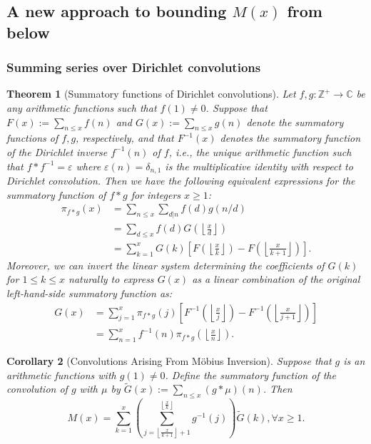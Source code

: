 \documentclass[11pt,reqno,a4letter]{article}
\numberwithin{figure}{section}
\numberwithin{table}{section}
\newcommand{\floor}[1]{\left\lfloor #1 \right\rfloor}
\newcommand{\Floor}[2]{\ensuremath{\left\lfloor \frac{#1}{#2} \right\rfloor}}
\theoremstyle{plain}
\newtheorem{theorem}{Theorem}
\newtheorem{cor}[theorem]{Corollary}
\numberwithin{theorem}{section}
\theoremstyle{definition}
\begin{document}
\subsection{A new approach to bounding $M(x)$ from below} 

\subsubsection{Summing series over Dirichlet convolutions} 

\begin{theorem}[Summatory functions of Dirichlet convolutions] 
\label{theorem_SummatoryFuncsOfDirCvls} 
Let $f,g: \mathbb{Z}^{+} \rightarrow \mathbb{C}$ be any arithmetic functions such that $f(1) \neq 0$. 
Suppose that $F(x) := \sum_{n \leq x} f(n)$ and $G(x) := \sum_{n \leq x} g(n)$ denote the summatory 
functions of $f,g$, respectively, and that $F^{-1}(x)$ denotes the summatory function of the 
Dirichlet inverse $f^{-1}(n)$ of $f$, i.e., the unique arithmetic function such that 
$f \ast f^{-1} = \varepsilon$ where $\varepsilon(n) = \delta_{n,1}$ is the multiplicative identity 
with respect to Dirichlet convolution. Then we have the following equivalent expressions for the 
summatory function of $f \ast g$ for integers $x \geq 1$: 
\begin{align*} 
\pi_{f \ast g}(x) & = \sum_{n \leq x} \sum_{d|n} f(d) g(n/d) \\ 
     & = \sum_{d \leq x} f(d) G\left(\Floor{x}{d}\right) \\ 
     & = \sum_{k=1}^{x} G(k) \left[F\left(\Floor{x}{k}\right) - 
     F\left(\Floor{x}{k+1}\right)\right]. 
\end{align*} 
Moreover, we can invert the linear system determining the coefficients of $G(k)$ for $1 \leq k \leq x$ 
naturally to express $G(x)$ as a linear combination of the original left-hand-side summatory function as:
\begin{align*} 
G(x) & = \sum_{j=1}^{x} \pi_{f \ast g}(j) \left[F^{-1}\left(\Floor{x}{j}\right) - 
     F^{-1}\left(\Floor{x}{j+1}\right)\right] \\ 
     & = \sum_{n=1}^{x} f^{-1}(n) \pi_{f \ast g}\left(\Floor{x}{n}\right). 
\end{align*} 
\end{theorem} 

\begin{cor}[Convolutions Arising From M\"obius Inversion] 
\label{cor_CvlGAstMu} 
Suppose that $g$ is an arithmetic functions with $g(1) \neq 0$. Define the summatory function of 
the convolution of $g$ with $\mu$ by $\widetilde{G}(x) := \sum_{n \leq x} (g \ast \mu)(n)$. 
Then 
\[
M(x) = \sum_{k=1}^{x} \left(\sum_{j=\floor{\frac{x}{k+1}}+1}^{\floor{\frac{x}{k}}} g^{-1}(j)\right) 
     \widetilde{G}(k), \forall x \geq 1. 
\]
\end{cor} 
\end{document}
